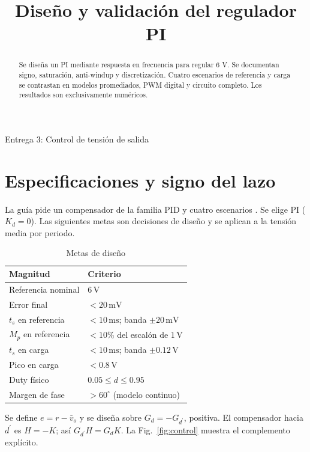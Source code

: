 \documentclass[conference,letterpaper]{IEEEtran}
\begin{document}
\title{Diseño y validación del regulador PI}\author{
}
\maketitle
\begin{center}\small Entrega 3: Control de tensión de salida\end{center}
\begin{abstract}Se diseña un PI mediante respuesta en frecuencia para regular 6 V. Se documentan signo, saturación, anti-windup y discretización. Cuatro escenarios de referencia y carga se contrastan en modelos promediados, PWM digital y circuito completo. Los resultados son exclusivamente numéricos.\end{abstract}
\section{Especificaciones y signo del lazo}
La guía pide un compensador de la familia PID y cuatro escenarios \cite{guide}. Se elige PI ($K_d=0$). Las siguientes metas son decisiones de diseño y se aplican a la tensión media por periodo.

\begin{table}[H]\caption{Metas de diseño}\label{tab:specs}\centering\footnotesize\setlength{\tabcolsep}{2pt}\renewcommand{\arraystretch}{1.18}\begin{tabularx}{\columnwidth}{LY}\toprule
Magnitud & Criterio\\\midrule
Referencia nominal & $6\,\mathrm{V}$\\
Error final & $<20\,\mathrm{mV}$\\
$t_s$ en referencia & $<10\,\mathrm{ms}$; banda $\pm20\,\mathrm{mV}$\\
$M_p$ en referencia & $<10\%$ del escalón de $1\,\mathrm{V}$\\
$t_s$ en carga & $<10\,\mathrm{ms}$; banda $\pm0.12\,\mathrm{V}$\\
Pico en carga & $<0.8\,\mathrm{V}$\\
Duty físico & $0.05\leq d\leq0.95$\\
Margen de fase & $>60^\circ$ (modelo continuo)\\\bottomrule\end{tabularx}\end{table}
Se define $e=r-\bar v_o$ y se diseña sobre $G_d=-G_{d^{\prime}}$, positiva. El compensador hacia $d^{\prime}$ es $H=-K$; así $G_{d^{\prime}}H=G_dK$. La Fig.~\ref{fig:control} muestra el complemento explícito.
\end{document}
